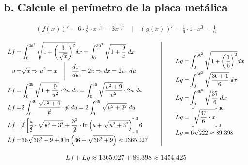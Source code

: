 \subsection*{b. Calcule el perímetro de la placa metálica}
\vspace{-0.5cm}
\begin{gather*}
  (f(x))' = 6 \cdot \frac{1}{2} \cdot x^{\frac{-1}{2}} = 3x^{\frac{-1}{2}}
  \quad\Bigg|\quad (g(x))' = \frac{1}{6} \cdot 1 \cdot x^0 = \frac{1}{6}
\end{gather*}
\hrulefill
\vspace{-0.5cm}
\begin{center}
  \[
    \begin{array}{c@{\hspace{0.8cm}}|@{\hspace{0.8cm}}c}
      \begin{aligned}
        Lf =& \int_0^{36^2} \sqrt{1 +
        \left(\frac{3}{\sqrt{x}}\right)^2} dx = \int_0^{36^2} \sqrt{1
        + \frac{9}{x}} \; dx \\
        u =& \sqrt{x} \Rightarrow u^2 = x \quad\Bigg|\quad
        \frac{dx}{du} = 2u \Rightarrow dx = 2u \cdot du \\
        Lf =& \int_0^{36} \sqrt{1 + \frac{9}{u^2}} \cdot 2u \; du =
        \int_0^{36} \sqrt{\frac{u^2 + 9}{u^2}} \cdot 2u \; du \\
        Lf =& 2\int_0^{36} \frac{\sqrt{u^2 + 9}}{\cancel{u}} \cdot
        \cancel{u} \; du
        = 2 \int_0^{36} \sqrt{u^2 + 3^2} \; du \\
        Lf =& \cancel{2}\left[\frac{u}{\cancel{2}} \cdot \sqrt{u^2 +
          3^2} + \frac{3^2}{\cancel{2}} \cdot \ln\left(u + \sqrt{u^2 +
        3^2}\right)\right]_0^36 \\
        Lf =& 36 \sqrt{36^2 + 9} + 9\ln\left(36 + \sqrt{36^2 +
        9}\right) \approx 1365.027
      \end{aligned}
      &
      \begin{aligned}
        Lg =& \int_0^{36^2} \sqrt{1 + \left(\frac{1}{6}\right)^2} dx \\
        Lg =& \int_0^{36^2} \sqrt{\frac{36+1}{6}} \; dx \\
        Lg =& \int_0^{36^2} \sqrt{\frac{37}{6}} \; dx \\
        Lg =& \left[\sqrt{\frac{37}{6} \cdot x}\right]_0^{36} \\
        Lg =& \; 6\sqrt{222} \approx 89.398
      \end{aligned}
    \end{array}
  \]
\end{center}
\hrulefill
\begin{gather*}
  Lf + Lg \approx 1365.027 + 89.398 \approx 1454.425
\end{gather*}

